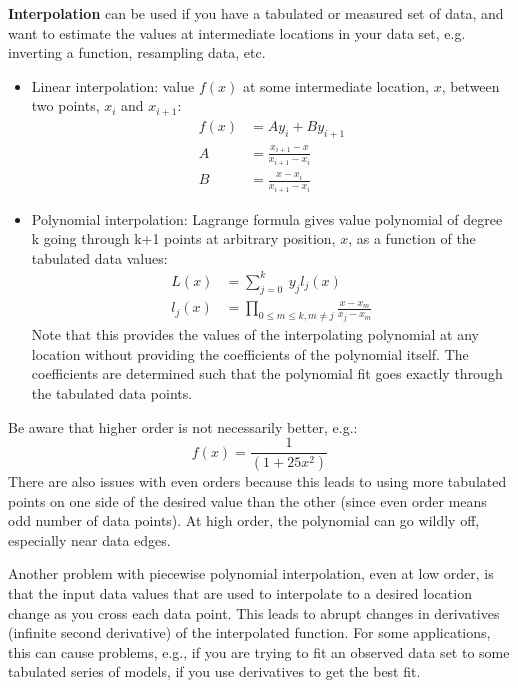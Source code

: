 \documentclass[12pt]{article}
\begin{document}
\textbf{Interpolation} can be used if you have a tabulated or measured set of
data, and want to estimate the values at intermediate locations in your data
set, e.g. inverting a function, resampling data, etc.
\begin{itemize}
    \item Linear interpolation: value $f(x)$ at some intermediate location,
        $x$, between two points, $x_i$ and $x_{i+1}$:
        \begin{align*}
            f(x) &= Ay_i + By_{i+1} \\
            A &= \frac{x_{i+1}-x}{x_{i+1}-x_i} \\
            B &= \frac{x-x_i}{x_{i+1}-x_i}
        \end{align*}
    \item Polynomial interpolation: Lagrange formula gives value polynomial
        of degree k going through k+1 points at arbitrary position, $x$, as
        a function of the tabulated data values:
        \begin{align*}
            L(x) &= \sum ^k_{j=0} \ y_j l_j (x) \\
            l_j(x) &= \prod _{0 \leq m \leq k, m \ne j}
            \frac{x-x_m}{x_j - x_m}
        \end{align*}
        Note that this provides the values of the interpolating polynomial at
        any location without providing the coefficients of the polynomial itself.
        The coefficients are determined such that the polynomial fit goes exactly
        through the tabulated data points.
\end{itemize}
        Be aware that higher order is not necessarily better, e.g.:
        \begin{equation*}
            f(x) = \frac{1}{(1+25x^2)}
        \end{equation*}
There are also issues with even orders because this leads to using more tabulated
points on one side of the desired value than the other (since even order means odd
number of data points). At high order, the polynomial can go wildly off, especially
near data edges.

Another problem with piecewise polynomial interpolation, even at low order, is that
the input data values that are used to interpolate to a desired location change as
you cross each data point. This leads to abrupt changes in derivatives (infinite
second derivative) of the interpolated function. For some applications, this can
cause problems, e.g., if you are trying to fit an observed data set to some
tabulated series of models, if you use derivatives to get the best fit.
\end{document}
